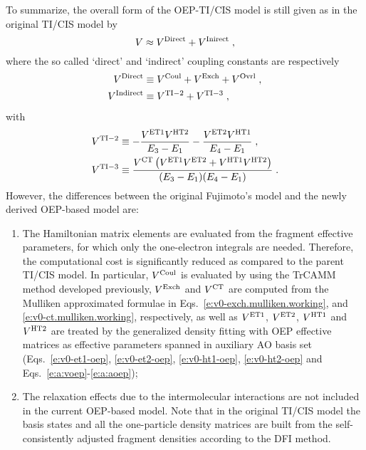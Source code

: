 To summarize, the overall form of the OEP-TI/CIS model is still given as in the original TI/CIS model
by
%
\begin{equation}
  V \approx V^{\rm Direct} + V^{\rm Inirect} \;,
\end{equation}
%
where the so called `direct' and `indirect' coupling constants are respectively
%
\begin{subequations}
\begin{align}
  V^{\rm Direct  } &\equiv V^{\rm Coul} + V^{\rm Exch} + V^{\rm Ovrl} \;,\\
  V^{\rm Indirect} &\equiv V^{\rm TI-2} + V^{\rm TI-3} \;,
\end{align}
\end{subequations}
%
with
%
\begin{subequations}
\begin{align}
 V^{\rm TI-2} &\equiv-\frac{V^{\rm ET1} V^{\rm HT2}}{E_3-E_1} -\frac{V^{\rm ET2} V^{\rm HT1}}{E_4-E_1}  \;,\\
 V^{\rm TI-3} &\equiv \frac{V^{\rm CT} \left( V^{\rm ET1} V^{\rm ET2} + V^{\rm HT1} V^{\rm HT2}\right) }{(E_3-E_1)(E_4-E_1)} \;.
\end{align}
\end{subequations}
%
However, 
the differences between the original Fujimoto's model and the newly derived OEP\hyp{}based model 
are: 
%
\begin{enumerate}
 \item The Hamiltonian matrix elements are evaluated from the fragment effective 
parameters, for which only the one\hyp{}electron integrals are needed. Therefore, the computational
cost is significantly reduced as compared to the parent TI/CIS model. In particular, 
$V^{\rm Coul}$ is evaluated by using the TrCAMM method developed previously,
$V^{\rm Exch}$ and $V^{\rm CT}$ are computed from the Mulliken approximated
formulae in Eqs.~\eqref{e:v0-exch.mulliken.working}, and \eqref{e:v0-ct.mulliken.working}, respectively,
as well as $V^{\rm ET1}$, $V^{\rm ET2}$,
$V^{\rm HT1}$ and $V^{\rm HT2}$ are treated by the generalized density fitting
with OEP effective matrices as effective parameters spanned in auxiliary AO basis set 
(Eqs.~\eqref{e:v0-et1-oep}, \eqref{e:v0-et2-oep}, \eqref{e:v0-ht1-oep}, \eqref{e:v0-ht2-oep}
and Eqs.~\eqref{e:a:voep}-\eqref{e:a:aoep}); 
 \item The relaxation effects due to the intermolecular interactions are not included
in the current OEP\hyp{}based model.
Note that in the original TI/CIS model the basis states and all the one\hyp{}particle density matrices are built from the
self\hyp{}consistently adjusted fragment densities according to the DFI method.
\end{enumerate}
%
